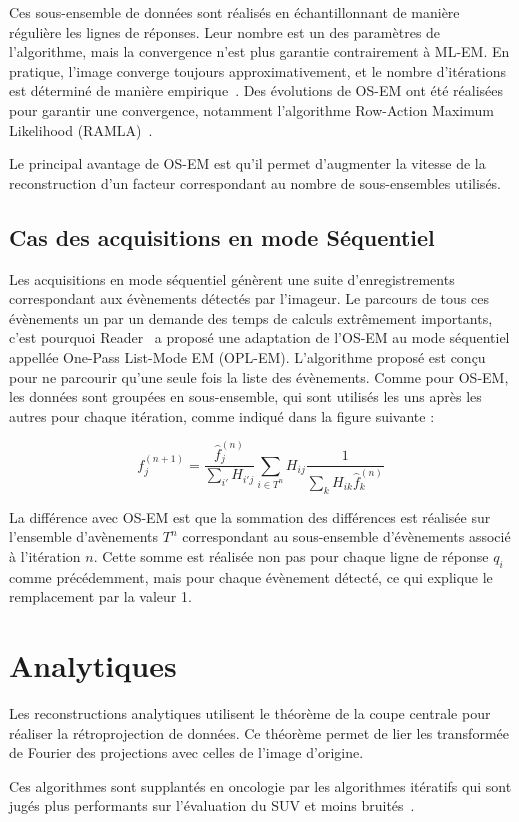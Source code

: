 Ces sous-ensemble de données sont réalisés en échantillonnant de manière régulière les lignes de réponses. Leur nombre est un des paramètres de l'algorithme, mais la convergence n'est plus garantie contrairement à ML-EM. En pratique, l'image converge toujours approximativement, et le nombre d'itérations est déterminé de manière empirique~\cite{bailey2005positron}. Des évolutions de OS-EM ont été réalisées pour garantir une convergence, notamment l'algorithme Row-Action Maximum Likelihood (RAMLA)~\cite{browne1996row, chiang2004clinical}.

Le principal avantage de OS-EM est qu'il permet d'augmenter la vitesse de la reconstruction d'un facteur correspondant au nombre de sous-ensembles utilisés.

	\subsection{Cas des acquisitions en mode Séquentiel}
\label{lab:OPLEM}

Les acquisitions en mode séquentiel génèrent une suite d'enregistrements correspondant aux évènements détectés par l'imageur. Le parcours de tous ces évènements un par un demande des temps de calculs extrêmement importants, c'est pourquoi Reader~\cite{reader2002one} a proposé une adaptation de l'OS-EM au mode séquentiel appellée One-Pass List-Mode EM (OPL-EM). L'algorithme proposé est conçu pour ne parcourir qu'une seule fois la liste des évènements. Comme pour OS-EM, les données sont groupées en sous-ensemble, qui sont utilisés les uns après les autres pour chaque itération, comme indiqué dans la figure suivante :

\begin{equation}
	f_j^{(n+1)}=\frac{\hat{f}_j^{(n)}}{\sum\limits_{i'}H_{i'j}}\sum\limits_{i \in T^n}H_{ij}\frac{1}{\sum\limits_{k}H_{ik}\hat{f}_k^{(n)}}
\label{eq:OSEM_seq}
\end{equation}

La différence avec OS-EM est que la sommation des différences est réalisée sur l'ensemble d'avènements $T^n$ correspondant au sous-ensemble d'évènements associé à l'itération $n$. Cette somme est réalisée non pas pour chaque ligne de réponse $q_i$ comme précédemment, mais pour chaque évènement détecté, ce qui explique le remplacement par la valeur 1.
		
	\section{Analytiques}

Les reconstructions analytiques utilisent le théorème de la coupe centrale pour réaliser la rétroprojection de données. Ce théorème permet de lier les transformée de Fourier des projections avec celles de l'image d'origine. 
 
Ces algorithmes sont supplantés en oncologie par les algorithmes itératifs qui sont jugés plus performants sur l'évaluation du SUV et moins bruités~\cite{schoder2004clinical}.
